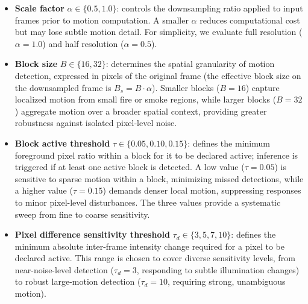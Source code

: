 \documentclass[
  10pt,
]{article}
\begin{document}
\begin{itemize}
\item
  \textbf{Scale factor} \(\alpha \in \{0.5, 1.0\}\): controls the
  downsampling ratio applied to input frames prior to motion
  computation. A smaller \(\alpha\) reduces computational cost but may
  lose subtle motion detail. For simplicity, we evaluate full resolution
  (\(\alpha = 1.0\)) and half resolution (\(\alpha =
  0.5\)).
\item
  \textbf{Block size} \(B \in \{16, 32\}\): determines the spatial
  granularity of motion detection, expressed in pixels of the original
  frame (the effective block size on the downsampled frame is
  \(B_s = B \cdot \alpha\)). Smaller blocks (\(B = 16\)) capture
  localized motion from small fire or smoke regions, while larger blocks
  (\(B = 32\)) aggregate motion over a broader spatial context,
  providing greater robustness against isolated pixel-level noise.
\item
  \textbf{Block active threshold} \(\tau \in \{0.05, 0.10, 0.15\}\):
  defines the minimum foreground pixel ratio within a block for it to be
  declared active; inference is triggered if at least one active block
  is detected. A low value (\(\tau = 0.05\)) is sensitive to sparse
  motion within a block, minimizing missed detections, while a higher
  value (\(\tau = 0.15\)) demands denser local motion, suppressing
  responses to minor pixel-level disturbances. The three values provide
  a systematic sweep from fine to coarse sensitivity.
\item
  \textbf{Pixel difference sensitivity threshold}
  \(\tau_d \in \{3, 5, 7, 10\}\): defines the minimum absolute
  inter-frame intensity change required for a pixel to be declared
  active. This range is chosen to cover diverse sensitivity levels, from
  near-noise-level detection (\(\tau_d = 3\), responding to subtle
  illumination changes) to robust large-motion detection
  (\(\tau_d = 10\), requiring strong, unambiguous motion).
\end{itemize}
\end{document}
